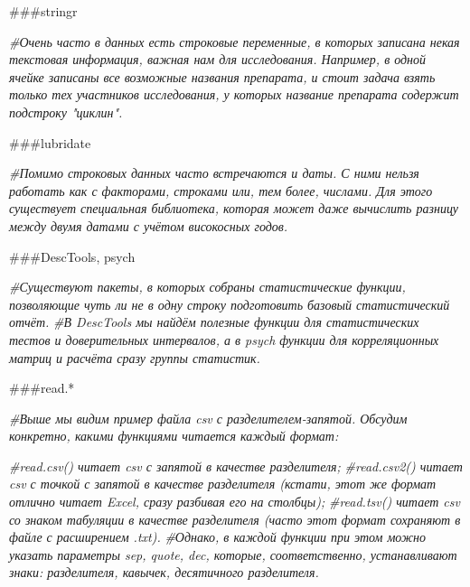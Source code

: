 \documentclass[
]{article}
\newenvironment{Shaded}{\begin{snugshade}}{\end{snugshade}}
\newcommand{\CommentTok}[1]{\textcolor[rgb]{0.56,0.35,0.01}{\textit{#1}}}
\begin{document}
\#\#\#stringr

\begin{Shaded}
\begin{Highlighting}[]
\CommentTok{\#Очень часто в данных есть строковые переменные, в которых записана некая текстовая информация, важная нам для исследования. Например, в одной ячейке записаны все возможные названия препарата, и стоит задача взять только тех участников исследования, у которых название препарата содержит подстроку "циклин".}
\end{Highlighting}
\end{Shaded}

\#\#\#lubridate

\begin{Shaded}
\begin{Highlighting}[]
\CommentTok{\#Помимо строковых данных часто встречаются и даты. С ними нельзя работать как с факторами, строками или, тем более, числами. Для этого существует специальная библиотека, которая может даже вычислить разницу между двумя датами с учётом високосных годов. }
\end{Highlighting}
\end{Shaded}

\#\#\#DescTools, psych

\begin{Shaded}
\begin{Highlighting}[]
\CommentTok{\#Существуют пакеты, в которых собраны статистические функции, позволяющие чуть ли не в одну строку подготовить базовый статистический отчёт.}
\CommentTok{\#В DescTools мы найдём полезные функции для статистических тестов и доверительных интервалов, а в psych функции для корреляционных матриц и расчёта сразу группы статистик.}
\end{Highlighting}
\end{Shaded}

\#\#\#read.*

\begin{Shaded}
\begin{Highlighting}[]
\CommentTok{\#Выше мы видим пример файла csv с разделителем{-}запятой. Обсудим конкретно, какими функциями читается каждый формат:}

\CommentTok{\#read.csv() читает csv с запятой в качестве разделителя;}
\CommentTok{\#read.csv2() читает csv с точкой с запятой в качестве разделителя (кстати, этот же формат отлично читает Excel, сразу разбивая его на столбцы);}
\CommentTok{\#read.tsv() читает csv со знаком табуляции в качестве разделителя (часто этот формат сохраняют в файле с расширением .txt).}
\CommentTok{\#Однако, в каждой функции при этом можно указать параметры sep, quote, dec, которые, соответственно, устанавливают знаки: разделителя, кавычек, десятичного разделителя. }
\end{Highlighting}
\end{Shaded}
\end{document}
